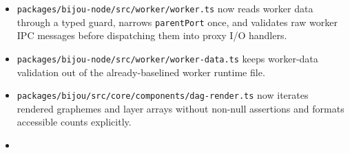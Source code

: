 \begin{itemize}
\tightlist
\item
  \texttt{p\allowbreak{}a\allowbreak{}c\allowbreak{}k\allowbreak{}a\allowbreak{}g\allowbreak{}e\allowbreak{}s\allowbreak{}/\allowbreak{}b\allowbreak{}i\allowbreak{}j\allowbreak{}o\allowbreak{}u\allowbreak{}-\allowbreak{}n\allowbreak{}o\allowbreak{}d\allowbreak{}e\allowbreak{}/\allowbreak{}s\allowbreak{}r\allowbreak{}c\allowbreak{}/\allowbreak{}w\allowbreak{}o\allowbreak{}r\allowbreak{}k\allowbreak{}e\allowbreak{}r\allowbreak{}/\allowbreak{}w\allowbreak{}o\allowbreak{}r\allowbreak{}k\allowbreak{}e\allowbreak{}r\allowbreak{}.\allowbreak{}t\allowbreak{}s} now reads worker data through a typed guard, narrows \texttt{p\allowbreak{}a\allowbreak{}r\allowbreak{}e\allowbreak{}n\allowbreak{}t\allowbreak{}P\allowbreak{}o\allowbreak{}r\allowbreak{}t} once, and validates raw worker IPC messages before dispatching them into proxy I/O handlers.
\item
  \texttt{p\allowbreak{}a\allowbreak{}c\allowbreak{}k\allowbreak{}a\allowbreak{}g\allowbreak{}e\allowbreak{}s\allowbreak{}/\allowbreak{}b\allowbreak{}i\allowbreak{}j\allowbreak{}o\allowbreak{}u\allowbreak{}-\allowbreak{}n\allowbreak{}o\allowbreak{}d\allowbreak{}e\allowbreak{}/\allowbreak{}s\allowbreak{}r\allowbreak{}c\allowbreak{}/\allowbreak{}w\allowbreak{}o\allowbreak{}r\allowbreak{}k\allowbreak{}e\allowbreak{}r\allowbreak{}/\allowbreak{}w\allowbreak{}o\allowbreak{}r\allowbreak{}k\allowbreak{}e\allowbreak{}r\allowbreak{}-\allowbreak{}d\allowbreak{}a\allowbreak{}t\allowbreak{}a\allowbreak{}.\allowbreak{}t\allowbreak{}s} keeps worker-data validation out of the already-baselined worker runtime file.
\item
  \texttt{p\allowbreak{}a\allowbreak{}c\allowbreak{}k\allowbreak{}a\allowbreak{}g\allowbreak{}e\allowbreak{}s\allowbreak{}/\allowbreak{}b\allowbreak{}i\allowbreak{}j\allowbreak{}o\allowbreak{}u\allowbreak{}/\allowbreak{}s\allowbreak{}r\allowbreak{}c\allowbreak{}/\allowbreak{}c\allowbreak{}o\allowbreak{}r\allowbreak{}e\allowbreak{}/\allowbreak{}c\allowbreak{}o\allowbreak{}m\allowbreak{}p\allowbreak{}o\allowbreak{}n\allowbreak{}e\allowbreak{}n\allowbreak{}t\allowbreak{}s\allowbreak{}/\allowbreak{}d\allowbreak{}a\allowbreak{}g\allowbreak{}-\allowbreak{}r\allowbreak{}e\allowbreak{}n\allowbreak{}d\allowbreak{}e\allowbreak{}r\allowbreak{}.\allowbreak{}t\allowbreak{}s} now iterates rendered graphemes and layer arrays without non-null assertions and formats accessible counts explicitly.
\item

\end{itemize}

